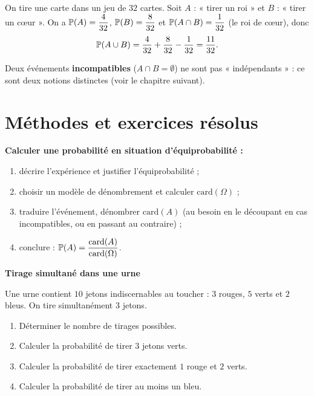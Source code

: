 \begin{exemple}
	On tire une carte dans un jeu de $32$ cartes. Soit $A$ : « tirer un roi »
	et $B$ : « tirer un cœur ». On a $\mathbb{P}(A) = \dfrac{4}{32}$,
	$\mathbb{P}(B) = \dfrac{8}{32}$ et $\mathbb{P}(A\cap B) = \dfrac{1}{32}$ (le roi de
	cœur), donc
	\[
	\mathbb{P}(A\cup B) = \frac{4}{32} + \frac{8}{32} - \frac{1}{32} = \frac{11}{32}.
	\]
\end{exemple}

\begin{attention}
	Deux événements \textbf{incompatibles} ($A\cap B=\emptyset$) ne sont pas
	« indépendants » : ce sont deux notions distinctes (voir le chapitre
	suivant).
\end{attention}


\section{Méthodes et exercices résolus}

\begin{methode}
	\textbf{Calculer une probabilité en situation d'équiprobabilité :}
	\begin{enumerate}
		\item décrire l'expérience et justifier l'équiprobabilité ;
		\item choisir un modèle de dénombrement et calculer
		$\mathrm{card}(\Omega)$ ;
		\item traduire l'événement, dénombrer $\mathrm{card}(A)$ (au besoin en
		le découpant en cas incompatibles, ou en passant au contraire) ;
		\item conclure : $\mathbb{P}(A)=\dfrac{\mathrm{card}(A)}{\mathrm{card}(\Omega)}$.
	\end{enumerate}
\end{methode}

\exerciceresolu
\textbf{Tirage simultané dans une urne}

Une urne contient $10$ jetons indiscernables au toucher : $3$ rouges,
$5$ verts et $2$ bleus. On tire simultanément $3$ jetons.
\begin{enumerate}
	\item Déterminer le nombre de tirages possibles.
	\item Calculer la probabilité de tirer $3$ jetons verts.
	\item Calculer la probabilité de tirer exactement $1$ rouge et $2$ verts.
	\item Calculer la probabilité de tirer au moins un bleu.
\end{enumerate}

